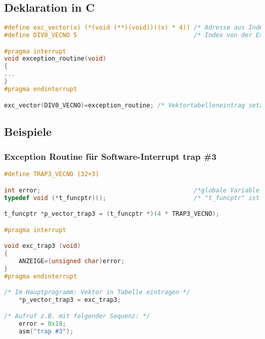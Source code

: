 \subsection{Deklaration in C}
\begin{lstlisting}[language=C]
#define exc_vector(x) (*(void (**)(void))((x) * 4)) /* Adresse aus Index berechnen */
#define DIV0_VECNO 5                                /* Index von der Exception Vector Assignment */

#pragma interrupt
void exception_routine(void)
{
...
}
#pragma endinterrupt

exc_vector(DIV0_VECNO)=exception_routine; /* Vektortabelleneintrag setzen exc_div0 ist ein funktionsname*/
\end{lstlisting}

\subsection{Beispiele} 

\subsubsection{Exception Routine für Software-Interrupt trap \#3}

\begin{lstlisting}[language=C]
#define TRAP3_VECNO (32+3)

int error;                                          /*globale Variable fier Zugriff aus Exception Routine*/
typedef void (*t_funcptr)();                        /* "t_funcptr" ist ein Zeiger auf eine Funktion */

t_funcptr *p_vector_trap3 = (t_funcptr *)(4 * TRAP3_VECNO);

#pragma interrupt

void exc_trap3 (void)
{
	ANZEIGE=(unsigned char)error;
}
#pragma endinterrupt

/* Im Hauptprogramm: Vektor in Tabelle eintragen */
	*p_vector_trap3 = exc_trap3;

/* Aufruf z.B. mit folgender Sequenz: */
	error = 0x18;
	asm("trap #3");
\end{lstlisting}


